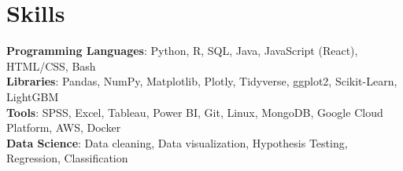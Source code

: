 \section{Skills}
 \begin{itemize}[leftmargin=0.15in, label={}]
    \small{\item{
     \textbf{Programming Languages}{: Python, R, SQL, Java, JavaScript (React), HTML/CSS, Bash} \\
     \textbf{Libraries}{: Pandas, NumPy, Matplotlib, Plotly, Tidyverse, ggplot2, Scikit-Learn, LightGBM}\\
     \textbf{Tools}{: SPSS, Excel, Tableau, Power BI, Git, Linux, MongoDB, Google Cloud Platform, AWS, Docker}\\
     \textbf{Data Science}{: Data cleaning, Data visualization, Hypothesis Testing, Regression, Classification}\\
    }}
 \end{itemize}